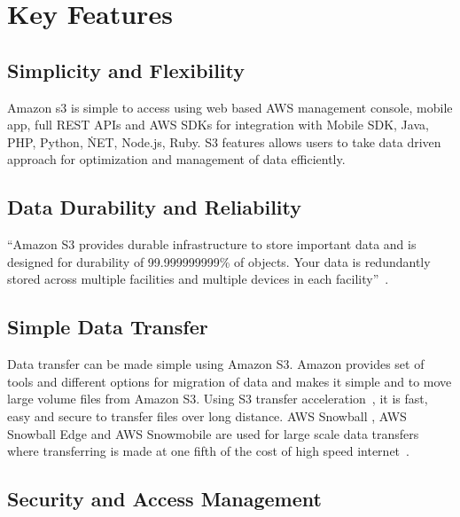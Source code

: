 \section{Key Features}


\subsection{Simplicity and Flexibility} 

Amazon s3 is simple to access using web based AWS management console,
mobile app, full REST APIs and AWS SDKs for integration with Mobile
SDK, Java, PHP, Python, \.NET, Node.js, Ruby. S3 features allows users
to take data driven approach for optimization and management of data
efficiently.


\subsection{Data Durability and Reliability} 

``Amazon S3 provides durable infrastructure to store important data and is
designed for durability of 99.999999999\% of objects. Your data is redundantly
stored across multiple facilities and multiple devices in each
facility''~\cite{hid-sp18-420-amazon-S3}.

\subsection{Simple Data Transfer} 

Data transfer can be made simple using Amazon S3. Amazon provides
set of tools and different options for migration of data and makes it
simple and to move large volume files from Amazon S3. Using S3
transfer acceleration~\cite{hid-sp18-420-amazon-S3-dataTransfer-FAQ},
it is fast, easy and secure to transfer files over long distance. AWS
Snowball \cite{?}, AWS Snowball Edge \cite{?} and AWS Snowmobile
\cite{?} are used for large scale data transfers where transferring is
made at one fifth of the cost of high speed
internet~\cite{hid-sp18-420-amazon-S3-cloud-migration}.

\subsection{Security and Access Management} 


